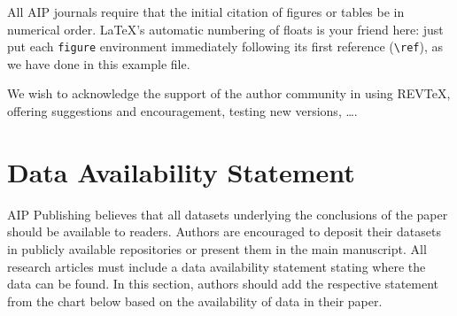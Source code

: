 \documentclass[%
 aip,
 amsmath,amssymb,
reprint, onecolumn %
]{revtex4-1}
\begin{document}
All AIP journals require that the initial citation of
figures or tables be in numerical order.
\LaTeX's automatic numbering of floats is your friend here:
just put each \texttt{figure} environment immediately following 
its first reference (\verb+\ref+), as we have done in this example file. 

\begin{acknowledgments}
We wish to acknowledge the support of the author community in using
REV\TeX{}, offering suggestions and encouragement, testing new versions,
\dots.
\end{acknowledgments}

\section*{Data Availability Statement}

AIP Publishing believes that all datasets underlying the conclusions of the paper should be available to readers. Authors are encouraged to deposit their datasets in publicly available repositories or present them in the main manuscript. All research articles must include a data availability statement stating where the data can be found. In this section, authors should add the respective statement from the chart below based on the availability of data in their paper.
\end{document}
